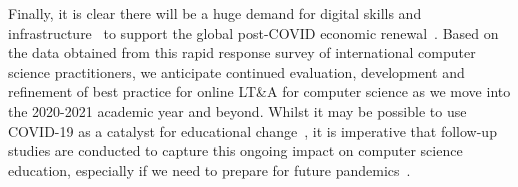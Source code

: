 \documentclass[conference]{IEEEtran}
\begin{document}

Finally, it is clear there will be a huge demand for digital skills
and
infrastructure~\cite{tryfonas+crick:petra2018,davenport-et-al:educon2020,baker:2020}
to support the global post-COVID economic
renewal~\cite{nadellaft:2020}. Based on the data obtained from this
rapid response survey of international computer science practitioners,
we anticipate continued evaluation, development and refinement of best
practice for online LT\&A for computer science as we move into the
2020-2021 academic year and beyond. Whilst it may be possible to use
COVID-19 as a catalyst for educational change~\cite{zhao:2020}, it is
imperative that follow-up studies are conducted to capture this
ongoing impact on computer science education, especially if we need to
prepare for future pandemics~\cite{strickland+zorpette:2020}.





 
\end{document}

